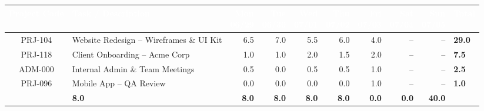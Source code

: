 \documentclass[11pt]{article}
\begin{document}
\begingroup
{}
\begin{tabularx}{\linewidth}{@{}C@{\hspace{2mm}}X@{\hspace{2mm}}D D D D D D D@{\hspace{2mm}}T@{}}
\toprule
{}
\textcolor{white}{\bfseries Project Code} & \textcolor{white}{\bfseries Task / Description} &
\makecell[c]{\textcolor{white}{\bfseries Mon}\\[-0.5mm]\textcolor{white}{\footnotesize 06/29}} &
\makecell[c]{\textcolor{white}{\bfseries Tue}\\[-0.5mm]\textcolor{white}{\footnotesize 06/30}} &
\makecell[c]{\textcolor{white}{\bfseries Wed}\\[-0.5mm]\textcolor{white}{\footnotesize 07/01}} &
\makecell[c]{\textcolor{white}{\bfseries Thu}\\[-0.5mm]\textcolor{white}{\footnotesize 07/02}} &
\makecell[c]{\textcolor{white}{\bfseries Fri}\\[-0.5mm]\textcolor{white}{\footnotesize 07/03}} &
\makecell[c]{\textcolor{white}{\bfseries Sat}\\[-0.5mm]\textcolor{white}{\footnotesize 07/04}} &
\makecell[c]{\textcolor{white}{\bfseries Sun}\\[-0.5mm]\textcolor{white}{\footnotesize 07/05}} &
\textcolor{white}{\bfseries Total} \\
\midrule
PRJ-104 & Website Redesign -- Wireframes \& UI Kit & 6.5 & 7.0 & 5.5 & 6.0 & 4.0 & -- & -- & \textbf{29.0} \\
PRJ-118 & Client Onboarding -- Acme Corp & 1.0 & 1.0 & 2.0 & 1.5 & 2.0 & -- & -- & \textbf{7.5} \\
ADM-000 & Internal Admin \& Team Meetings & 0.5 & 0.0 & 0.5 & 0.5 & 1.0 & -- & -- & \textbf{2.5} \\
PRJ-096 & Mobile App -- QA Review & 0.0 & 0.0 & 0.0 & 0.0 & 1.0 & -- & -- & \textbf{1.0} \\
\bottomrule
{}
 &
\bfseries 8.0 & \bfseries 8.0 & \bfseries 8.0 & \bfseries 8.0 & \bfseries 8.0 & \bfseries 0.0 & \bfseries 0.0 &
\bfseries\color{accentdark} 40.0 \\
\end{tabularx}
\endgroup
\end{document}
